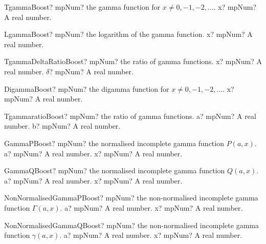 \documentclass[12pt,a4paper,openany]{book}
\begin{document}
\begin{mpFunctionsExtract}
\mpFunctionOne
{TgammaBoost? mpNum? the gamma function for $x \neq 0, -1, -2,\ldots$.}
{x? mpNum? A real number.}
\end{mpFunctionsExtract}

\begin{mpFunctionsExtract}
\mpFunctionOne
{LgammaBoost? mpNum? the logarithm of the gamma function.}
{x? mpNum? A real number.}
\end{mpFunctionsExtract}

\begin{mpFunctionsExtract}
\mpFunctionTwo
{TgammaDeltaRatioBoost? mpNum?  the ratio of gamma functions.}
{x? mpNum? A real number.}
{$\delta$? mpNum? A real number.}
\end{mpFunctionsExtract}

\begin{mpFunctionsExtract}
\mpFunctionOne
{DigammaBoost? mpNum? the digamma function for $x \neq 0, -1, -2,\ldots$.}
{x? mpNum? A real number.}
\end{mpFunctionsExtract}

\begin{mpFunctionsExtract}
\mpFunctionTwo
{TgammaratioBoost? mpNum?  the ratio of gamma functions.}
{a? mpNum? A real number.}
{b? mpNum? A real number.}
\end{mpFunctionsExtract}

\begin{mpFunctionsExtract}
\mpFunctionTwo
{GammaPBoost? mpNum? the normalised incomplete gamma function $P(a,x)$.}
{a? mpNum? A real number.}
{x? mpNum? A real number.}
\end{mpFunctionsExtract}

\begin{mpFunctionsExtract}
\mpFunctionTwo
{GammaQBoost? mpNum? the normalised incomplete gamma function $Q(a,x)$.}
{a? mpNum? A real number.}
{x? mpNum? A real number.}
\end{mpFunctionsExtract}

\begin{mpFunctionsExtract}
\mpFunctionTwo
{NonNormalisedGammaPBoost? mpNum? the non-normalised incomplete gamma function $\Gamma(a,x)$.}
{a? mpNum? A real number.}
{x? mpNum? A real number.}
\end{mpFunctionsExtract}

\begin{mpFunctionsExtract}
\mpFunctionTwo
{NonNormalisedGammaQBoost? mpNum? the non-normalised incomplete gamma function $\gamma(a,x)$.}
{a? mpNum? A real number.}
{x? mpNum? A real number.}
\end{mpFunctionsExtract}
\end{document}

